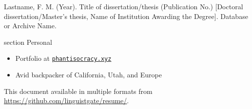 \documentclass[10pt]{article}
\newcommand{\sectionhead}[1]{%
\begin{bgbox}{section}%
{\Large \textsf{#1}}%
\end{bgbox}%
}
\begin{document}
Lastname, F. M. (Year). Title of dissertation/thesis (Publication No.) [Doctoral dissertation/Master’s thesis, Name of Institution Awarding the Degree]. Database or Archive Name.

\sectionhead{Personal}
\label{Extracurricular}
\begin{itemize}
\item Portfolio at \href{https://phantisocracy.xyz}{\texttt{phantisocracy.xyz}}
\item Avid backpacker of California, Utah, and Europe
\end{itemize}

\vfill
This document available in multiple formats from
\url{https://github.com/linguistgate/resume/}.
\end{document}
